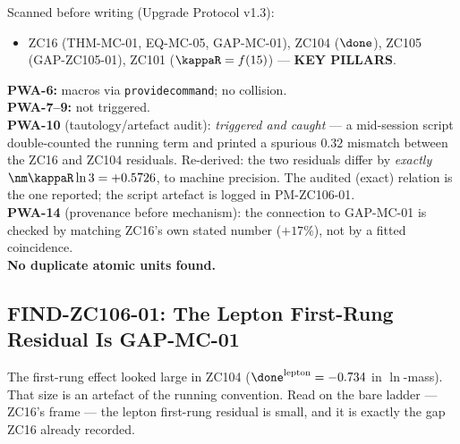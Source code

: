 \documentclass[12pt, a4paper]{article}
\begin{document}
\begin{formalbox}[title={Pre-Work Audit Record --- ZC106}]
Scanned before writing (Upgrade Protocol v1.3):
\begin{itemize}[leftmargin=2em, noitemsep]
  \item ZC16 (THM-MC-01, EQ-MC-05, GAP-MC-01), ZC104 ($\done$), ZC105
    (GAP-ZC105-01), ZC101 ($\kappaR=f(15)$) --- \textbf{KEY PILLARS}.
\end{itemize}
\textbf{PWA-6:} macros via \texttt{providecommand}; no collision.\\
\textbf{PWA-7--9:} not triggered.\\
\textbf{PWA-10} (tautology/artefact audit): \emph{triggered and caught} --- a
mid-session script double-counted the running term and printed a spurious $0.32$
mismatch between the ZC16 and ZC104 residuals. Re-derived: the two residuals
differ by \emph{exactly} $\nm\kappaR\ln 3=+0.5726$, to machine precision. The
audited (exact) relation is the one reported; the script artefact is logged in
PM-ZC106-01.\\
\textbf{PWA-14} (provenance before mechanism): the connection to GAP-MC-01 is
checked by matching ZC16's own stated number ($+17\%$), not by a fitted
coincidence.\\
\textbf{No duplicate atomic units found.}
\end{formalbox}

\newpage

\subsection{FIND-ZC106-01: The Lepton First-Rung Residual Is GAP-MC-01}
\label{sec:lepton-zc106}

The first-rung effect looked large in ZC104 ($\done^{\rm lepton}=-0.734$ in
$\ln$-mass). That size is an artefact of the running convention. Read on the bare
ladder --- ZC16's frame --- the lepton first-rung residual is small, and it is
exactly the gap ZC16 already recorded.

\end{document}
